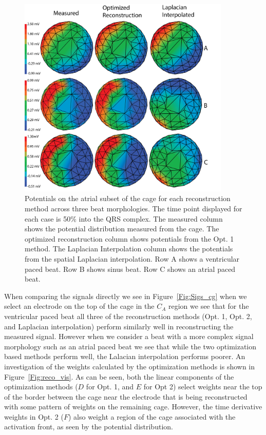 \documentclass[12pt]{article}
\begin{document}
\begin{figure}[h]
	\includegraphics[width=0.9\textwidth]{Figures/Figure1.png}
	\caption{Potentials on the atrial subset of the cage for each
		reconstruction method across three beat morphologies. The time point
		displayed for each case is 50\% into the QRS complex. The measured
		column shows the potential distribution measured from the cage. The optimized
		reconstruction column shows potentials from the Opt. 1 method. The
		Laplacian Interpolation column shows the potentials from the spatial
		Laplacian interpolation. Row A shows a ventricular paced beat. Row B
		shows sinus beat. Row C shows an atrial paced beat.}
	\label{Fig:Res}
\end{figure}

When comparing the signals directly we see in Figure~\ref{Fig:Sigs_cg} when we select an electrode on the top of the cage in the $C_A$ region we see that for the ventricular paced beat all three of the reconstruction methods (Opt. 1, Opt. 2, and Laplacian interpolation) perform similarly well in reconstructing the measured signal. However when we consider a beat with a more complex signal morphology such as an atrial paced beat we see that while the two optimization based methods perform well, the Lalacian interpolation performs poorer. An investigation of the weights calculated by the optimization methods is shown in Figure~\ref{Fig:reco_vis}. As can be seen, both the linear components of the optimization methods ($D$ for Opt. 1, and $E$ for Opt 2) select weights near the top of the border between the cage near the electrode that is being reconstructed with some pattern of weights on the remaining cage. However, the time derivative weights in Opt. 2 ($F$) also weight a region of the cage associated with the activation front, as seen by the potential distribution.
\end{document}
